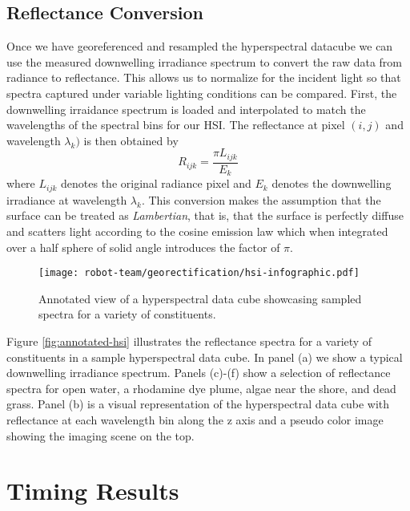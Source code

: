 \subsection{Reflectance Conversion}

Once we have georeferenced and resampled the hyperspectral datacube we can use the measured downwelling irradiance spectrum to convert the raw data from radiance to reflectance. This allows us to normalize for the incident light so that spectra captured under variable lighting conditions can be compared. First, the downwelling irraidance spectrum is loaded and interpolated to match the wavelengths of the spectral bins for our HSI. The reflectance at pixel $(i,j)$ and wavelength $\lambda_k)$ is then obtained by
\begin{equation}
  R_{ijk} = \frac{\pi L_{ijk}}{E_k}
\end{equation}
where $L_{ijk}$ denotes the original radiance pixel and $E_k$ denotes the downwelling irradiance at wavelength $\lambda_k$. This conversion makes the assumption that the surface can be treated as \textit{Lambertian}, that is, that the surface is perfectly diffuse and scatters light according to the cosine emission law which when integrated over a half sphere of solid angle introduces the factor of $\pi$.

\begin{figure}[h]
  \centering
  \texttt{[image: robot-team/georectification/hsi-infographic.pdf]}
  \caption{Annotated view of a hyperspectral data cube showcasing sampled spectra for a variety of constituents.\label{fig:hsi-infographic}}
  \label{fig:annoted-hsi}
\end{figure}  

Figure \ref{fig:annotated-hsi} illustrates the reflectance spectra for a variety of constituents in a sample hyperspectral data cube. In panel (a) we show a typical downwelling irradiance spectrum. Panels (c)-(f) show a selection of reflectance spectra for open water, a rhodamine dye plume, algae near the shore, and dead grass. Panel (b) is a visual representation of the hyperspectral data cube with reflectance at each wavelength bin along the z axis and a pseudo color image showing the imaging scene on the top.


\section{Timing Results}


